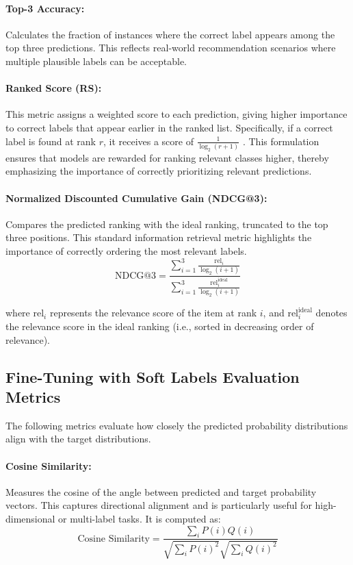 \paragraph{Top-3 Accuracy:}  
Calculates the fraction of instances where the correct label appears among the top three predictions. This reflects real-world recommendation scenarios where multiple plausible labels can be acceptable.

\paragraph{Ranked Score (RS):}  
This metric assigns a weighted score to each prediction, giving higher importance to correct labels that appear earlier in the ranked list. Specifically, if a correct label is found at rank \( r \), it receives a score of  \( \frac{1}{\log_2(r+1)} \) . This formulation ensures that models are rewarded for ranking relevant classes higher, thereby emphasizing the importance of correctly prioritizing relevant predictions.

\paragraph{Normalized Discounted Cumulative Gain (NDCG@3):}  
Compares the predicted ranking with the ideal ranking, truncated to the top three positions. This standard information retrieval metric highlights the importance of correctly ordering the most relevant labels.
\begin{equation}
\text{NDCG@3} = \frac{\sum_{i=1}^{3} \frac{\text{rel}_i}{\log_2(i+1)}}{\sum_{i=1}^{3} \frac{\text{rel}_i^{\text{ideal}}}{\log_2(i+1)}}
\end{equation}

where $\text{rel}_i$ represents the relevance score of the item at rank $i$, and $\text{rel}_i^{\text{ideal}}$ denotes the relevance score in the ideal ranking (i.e., sorted in decreasing order of relevance).

\subsection{Fine-Tuning with Soft Labels Evaluation Metrics}

The following metrics evaluate how closely the predicted probability distributions align with the target distributions.


\paragraph{Cosine Similarity:}  
Measures the cosine of the angle between predicted and target probability vectors. This captures directional alignment and is particularly useful for high-dimensional or multi-label tasks. It is computed as:
\begin{equation}
    \text{Cosine Similarity} = \frac{\sum_{i} P(i) Q(i)}{\sqrt{\sum_{i} P(i)^2} \sqrt{\sum_{i} Q(i)^2}}
\end{equation}

